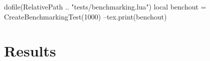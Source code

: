 \documentclass[oneside]{memoir}
\begin{document}
\pagestyle{empty}

\begin{luacode*}
	dofile(RelativePath .. "tests/benchmarking.lua")
	local benchout = CreateBenchmarkingTest(1000)
	--tex.print(benchout)
\end{luacode*}

\chapter{Results}

\PrintRpgTexErrors

\PrintRpgTexBenchmarking
\end{document}
